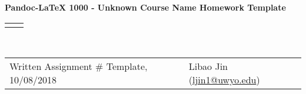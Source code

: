 \documentclass[11pt]{article}
\renewcommand{\title}[1]{\textbf{#1}\\}
\renewcommand{\line}{\begin{tabularx}{\textwidth}{X>{\raggedleft}X}\hline\\\end{tabularx}\\[-0.5cm]}
\newcommand{\leftright}[2]{\begin{tabularx}{\textwidth}{X>{\raggedleft}X}#1%
& #2\\\end{tabularx}\\[-0.5cm]}
\renewcommand{\theequation}{\thesection.\arabic{equation}}
\numberwithin{equation}{section}
\begin{document}
\title{Pandoc-LaTeX 1000 - Unknown Course Name Homework Template}
\line
\leftright{Written Assignment \# Template, 10/08/2018}{Libao Jin (\url{ljin1@uwyo.edu})}

\vspace*{-2cm}
\renewcommand{\theequation}{1.\arabic{equation}}
\setcounter{equation}{0}

\end{document}
